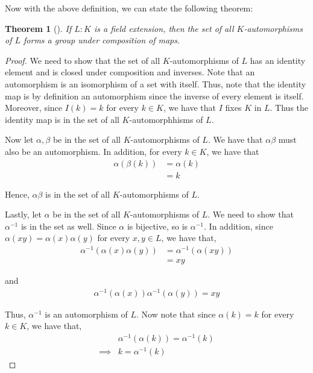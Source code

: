 \documentclass[11pt, a4paper, oneside]{article}
\theoremstyle{plain}
\newtheorem*{thm*}{Theorem}
\theoremstyle{plain}
\theoremstyle{plain}
\theoremstyle{plain}
\theoremstyle{definition}
\theoremstyle{example}
\begin{document}
{\par
Now with the above definition, we can state the following theorem:

\begin{thm*}[{\cite[Thm.\ 8.2]{stewart}}] 
If $L : K$ is a field extension, then the set of all $K$-automorphisms of $L$ forms a group under composition of maps.
\end{thm*}

\begin{proof}
We need to show that the set of all $K$-automorphisms of $L$ has an identity element and is closed under composition and inverses. Note that an automorphism is an isomorphism of a set with itself. Thus, note that the identity map is by definition an automorphism since the inverse of every element is itself. Moreover, since $I(k) = k$ for every $k \in K$, we have that $I$ fixes $K$ in $L$. Thus the identity map is in the set of all $K$-automorphhisms of $L$.

\par
Now let $\alpha, \beta$ be in the set of all $K$-automorphisms of $L$. We have that $\alpha \beta$ must also be an automorphism. In addition, for every $k \in K$, we have that
\begin{align*}
\alpha(\beta(k)) &= \alpha(k)\\
&= k
\end{align*}

Hence, $\alpha \beta$ is in the set of all $K$-automorphisms of $L$.

\par
Lastly, let $\alpha$ be in the set of all $K$-automorphisms of $L$. We need to show that $\alpha^{-1}$ is in the set as well. Since $\alpha$ is bijective, so is $\alpha^{-1}$. In addition, since $\alpha(xy) = \alpha(x)\alpha(y)$ for every $x, y \in L$, we have that,
\begin{align*}
\alpha^{-1}(\alpha(x)\alpha(y)) &= \alpha^{-1}(\alpha(xy))\\
&= xy
\end{align*}

and
\begin{align*}
\alpha^{-1}(\alpha(x))\alpha^{-1}(\alpha(y)) = xy
\end{align*}

Thus, $\alpha^{-1}$ is an automorphism of $L$. Now note that since $\alpha(k) = k$ for every $k \in K$, we have that,
\begin{align*}
&\alpha^{-1}(\alpha(k)) = \alpha^{-1}(k)\\
\implies &k = \alpha^{-1}(k)
\end{align*}


\end{proof}}
\end{document}
